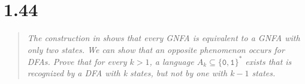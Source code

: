 \section{1.44}

\begin{quote}\color{black!80}\slshape
  The construction in \cite[Theorem~1.54]{Sipser} shows that every GNFA is equivalent to
  a GNFA with only two states. We can show that an opposite phenomenon occurs for DFAs.
  Prove that for every $k>1$, a language $A_k \subseteq \{\mathtt 0, \mathtt 1\}^*$ exists
  that is recognized by a DFA with k states, but not by one with $k-1$ states. \cite[p.~90]{Sipser}
\end{quote}
